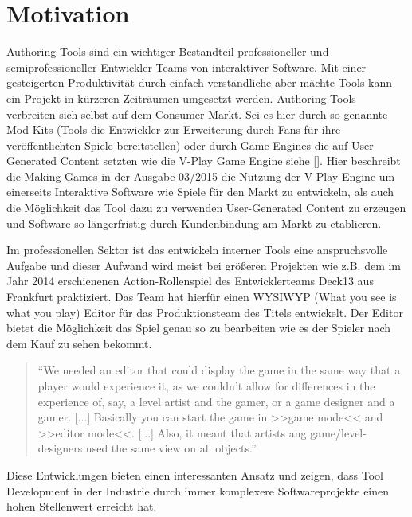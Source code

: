 \documentclass[pagesize, paper=a4, fontsize=12pt,titlepage=true, headings=small, headnosepline, abstractoff, liststotoc, nochapterprefix, plainheadsepline, twoside]{scrreprt}
\begin{document}
\section{Motivation}
Authoring Tools sind ein wichtiger Bestandteil professioneller und semiprofessioneller Entwickler Teams von interaktiver Software. Mit einer gesteigerten Produktivität durch einfach verständliche aber mächte Tools kann ein Projekt in kürzeren Zeiträumen umgesetzt werden. Authoring Tools verbreiten sich selbst auf dem Consumer Markt. Sei es hier durch so genannte Mod Kits (Tools die Entwickler zur Erweiterung durch Fans für ihre veröffentlichten Spiele bereitstellen) oder durch Game Engines die auf User Generated Content setzten wie die V-Play Game Engine siehe []. Hier beschreibt die Making Games in der Ausgabe 03/2015 die Nutzung der V-Play Engine um einerseits Interaktive Software wie Spiele für den Markt zu entwickeln, als auch die Möglichkeit das Tool dazu zu verwenden User-Generated Content zu erzeugen und Software so längerfristig durch Kundenbindung am Markt zu etablieren.

Im professionellen Sektor ist das entwickeln interner Tools eine anspruchsvolle Aufgabe und dieser Aufwand wird meist bei größeren Projekten wie z.B. dem im Jahr 2014 erschienenen Action-Rollenspiel  des Entwicklerteams Deck13 aus Frankfurt praktiziert. Das Team hat hierfür einen WYSIWYP (What you see is what you play) Editor für das Produktionsteam des Titels entwickelt. Der Editor bietet die Möglichkeit das Spiel genau so zu bearbeiten wie es der Spieler nach dem Kauf zu sehen bekommt.
\begin{quote}
“We needed an editor that could display the game in the same way that a player would experience it, as we couldn’t allow for differences in the experience of, say, a level artist and the gamer, or a game designer and a gamer. [...] Basically you can start the game in >>game mode<< and >>editor mode<<.  [...] Also, it meant that artists ang game/level-designers used the same view on all objects.”

\end{quote}

Diese Entwicklungen bieten einen interessanten Ansatz und zeigen, dass Tool Development in der Industrie durch immer komplexere Softwareprojekte einen hohen Stellenwert erreicht hat.
\end{document}
